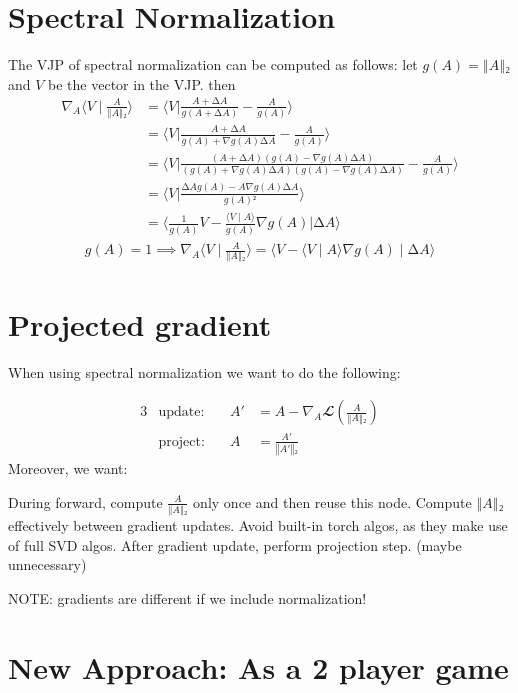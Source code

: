 \documentclass[10pt]{article}
\begin{document}
\section{Spectral Normalization}
The VJP of spectral normalization can be computed as follows: let $g(A) = ‖A‖₂$ and $V$ be the vector in the VJP. then
%
\begin{align*}%
∇_A⟨V ∣ \frac{A}{‖A‖₂}⟩
	&= ⟨V | \frac{A+∆A}{g(A+∆A)} - \frac{A}{g(A)}⟩
\\  &= ⟨V | \frac{A+∆A}{g(A)+∇g(A)∆A} - \frac{A}{g(A)}⟩
\\  &= ⟨V | \frac{(A+∆A)(g(A)-∇g(A)∆A)}{(g(A)+∇g(A)∆A)(g(A) - ∇g(A)∆A)} - \frac{A}{g(A)}⟩
\\  &= ⟨V | \frac{ ∆Ag(A)- A∇g(A)∆A}{g(A)²}⟩
\\  &= ⟨\tfrac{1}{g(A)}V - \tfrac{⟨V∣A⟩}{g(A)}∇g(A) | ∆A⟩
\end{align*}%
%
%
\begin{align*}%
g(A)=1 ⟹ ∇_A⟨V ∣ \frac{A}{‖A‖₂}⟩ = ⟨V - ⟨V∣A⟩∇g(A)∣∆A⟩%
\end{align*}%
%

\section{Projected gradient}

When using spectral normalization we want to do the following:

%
\begin{alignat*}{3}%
   &\text{update:}\quad& A' &= A - ∇_A 𝓛(\frac{A}{‖A‖₂})%
\\ &\text{project:}\quad& A &= \frac{A'}{‖A'‖₂}
\end{alignat*}%
%
Moreover, we want:
%
\begin{outline}%
\1 During forward, compute $\frac{A}{‖A‖₂}$ only once and then reuse this node.
\1 Compute $‖A‖₂$ effectively between gradient updates.
	\2 Avoid built-in torch algos, as they make use of full SVD algos.
\1 After gradient update, perform projection step. (maybe unnecessary)
\end{outline}%
%
NOTE: gradients are different if we include normalization!











\section{New Approach: As a 2 player game}
\end{document}
